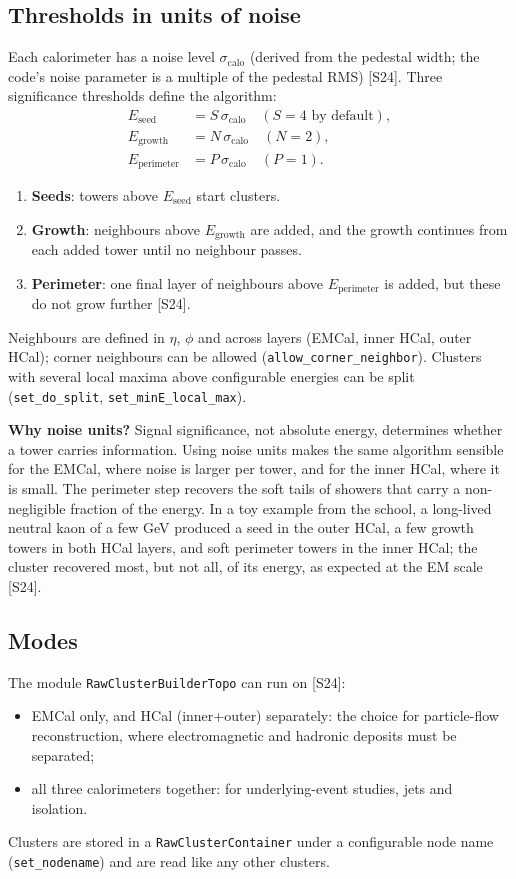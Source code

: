 \documentclass[11pt,letterpaper]{article}
\begin{document}
\subsection{Thresholds in units of noise}
Each calorimeter has a noise level $\sigma_{\mathrm{calo}}$ (derived from the pedestal width; the code's noise parameter is a multiple of the pedestal RMS) [S24].
Three significance thresholds define the algorithm:
\begin{align}
E_{\mathrm{seed}} &= S\,\sigma_{\mathrm{calo}} \quad (S=4 \text{ by default}),\\
E_{\mathrm{growth}} &= N\,\sigma_{\mathrm{calo}} \quad (N=2),\\
E_{\mathrm{perimeter}} &= P\,\sigma_{\mathrm{calo}} \quad (P=1).
\end{align}
\begin{enumerate}
\item \textbf{Seeds}: towers above $E_{\mathrm{seed}}$ start clusters.
\item \textbf{Growth}: neighbours above $E_{\mathrm{growth}}$ are added, and the growth continues from each added tower until no neighbour passes.
\item \textbf{Perimeter}: one final layer of neighbours above $E_{\mathrm{perimeter}}$ is added, but these do not grow further [S24].
\end{enumerate}
Neighbours are defined in $\eta$, $\phi$ and across layers (EMCal, inner HCal, outer HCal); corner neighbours can be allowed (\texttt{allow\_corner\_neighbor}).
Clusters with several local maxima above configurable energies can be split (\texttt{set\_do\_split}, \texttt{set\_minE\_local\_max}).

\textbf{Why noise units?} Signal significance, not absolute energy, determines whether a tower carries information.
Using noise units makes the same algorithm sensible for the EMCal, where noise is larger per tower, and for the inner HCal, where it is small.
The perimeter step recovers the soft tails of showers that carry a non-negligible fraction of the energy.
In a toy example from the school, a long-lived neutral kaon of a few GeV produced a seed in the outer HCal, a few growth towers in both HCal layers, and soft perimeter towers in the inner HCal; the cluster recovered most, but not all, of its energy, as expected at the EM scale [S24].

\subsection{Modes}
The module \texttt{RawClusterBuilderTopo} can run on [S24]:
\begin{itemize}
\item EMCal only, and HCal (inner+outer) separately: the choice for particle-flow reconstruction, where electromagnetic and hadronic deposits must be separated;
\item all three calorimeters together: for underlying-event studies, jets and isolation.
\end{itemize}
Clusters are stored in a \texttt{RawClusterContainer} under a configurable node name (\texttt{set\_nodename}) and are read like any other clusters.
\end{document}

